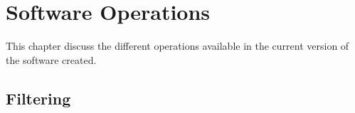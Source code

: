 \chapter{Software Operations}\label{sec:operation}
This chapter discuss the different operations available in the current version
of the software created.


\section{Filtering}

\section{}

\section{}

\section{}
